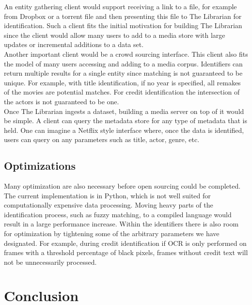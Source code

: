 \documentclass[paper=a4, fontsize=11pt]{scrartcl} %
\numberwithin{equation}{section} %
\numberwithin{figure}{section} %
\numberwithin{table}{section} %
\begin{document}
An entity gathering client would support receiving a link to a file, for example from Dropbox or a torrent file and then presenting this file to The Librarian for identification. Such a client fits the initial motivation for building The Librarian since the client would allow many users to add to a media store with large updates or incremental additions to a data set. \\

Another important client would be a crowd sourcing interface. This client also fits the model of many users accessing and adding to a media corpus. Identifiers can return multiple results for a single entity since matching is not guaranteed to be unique. For example, with title identification, if no year is specified, all remakes of the movies are potential matches. For credit identification the intersection of the actors is not guaranteed to be one. \\

Once The Librarian ingests a dataset, building a media server on top of it would be simple. A client can query the metadata store for any type of metadata that is held. One can imagine a Netflix style interface where, once the data is identified, users can query on any parameters such as title, actor, genre, etc. \\

\subsection{Optimizations}
\label{sec:optimizations}
Many optimization are also necessary before open sourcing could be completed. The current implementation is in Python, which is not well suited for computationally expensive data processing. Moving heavy parts of the identification process, such as fuzzy matching, to a compiled language would result in a large performance increase. Within the identifiers there is also room for optimization by tightening some of the arbitrary parameters we have designated. For example, during credit identification if OCR is only performed on frames with a threshold percentage of black pixels, frames without credit text will not be unnecessarily processed. \\


\section{Conclusion}
\label{sec:conclusion}
\end{document}
